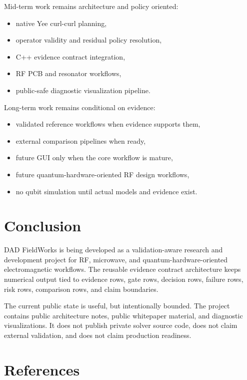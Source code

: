 \documentclass[11pt,a4paper]{article}
\begin{document}
Mid-term work remains architecture and policy oriented:

\begin{itemize}
  \item native Yee curl-curl planning,
  \item operator validity and residual policy resolution,
  \item C++ evidence contract integration,
  \item RF PCB and resonator workflows,
  \item public-safe diagnostic visualization pipeline.
\end{itemize}

Long-term work remains conditional on evidence:

\begin{itemize}
  \item validated reference workflows when evidence supports them,
  \item external comparison pipelines when ready,
  \item future GUI only when the core workflow is mature,
  \item future quantum-hardware-oriented RF design workflows,
  \item no qubit simulation until actual models and evidence exist.
\end{itemize}

\section{Conclusion}

DAD FieldWorks is being developed as a validation-aware research and development project for RF, microwave, and quantum-hardware-oriented electromagnetic workflows. The reusable evidence contract architecture keeps numerical output tied to evidence rows, gate rows, decision rows, failure rows, risk rows, comparison rows, and claim boundaries.

The current public state is useful, but intentionally bounded. The project contains public architecture notes, public whitepaper material, and diagnostic visualizations. It does not publish private solver source code, does not claim external validation, and does not claim production readiness.

\section{References}
\end{document}
